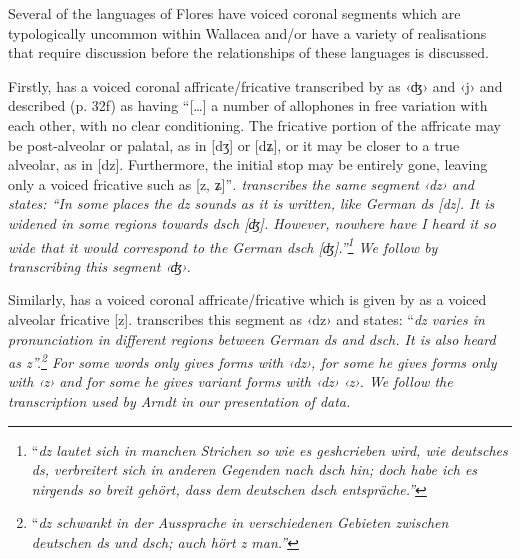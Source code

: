Several of the languages of Flores have voiced coronal segments
which are typologically uncommon within Wallacea and/or have
a variety of realisations that require discussion before the
relationships of these languages is discussed.

Firstly,  has a voiced coronal affricate/fricative transcribed
by \citet{Elias2018} as ‹ʤ›
and ‹j› and described (p.
32f) as having “[{\ldots}] a number of allophones in free variation
with each other, with no clear conditioning.
The fricative portion of the affricate may be post-alveolar or
palatal, as in [dʒ] or [dʑ],
or it may be closer to a true alveolar, as in [dz].
Furthermore, the initial stop may be entirely gone,
leaving only a voiced fricative such as [z,
ʑ]”\it{.} \citet[6]{Arndt1933} transcribes the same segment ‹dz›
and states: “In some places the \it{dz} sounds as it is written,
like German \it{ds} [dz].
It is widened in some regions towards \it{dsch} [ʤ].
However, nowhere have I heard it so wide that it would correspond
to the German \it{dsch} [ʤ].”\footnote{
		“\it{dz} lautet sich in
		manchen Strichen so wie es geshcrieben wird,
		wie deutsches \it{ds}, verbreitert sich in anderen Gegenden nach
		\it{dsch} hin; doch habe ich es nirgends so breit gehört,
		dass dem deutschen \it{dsch} entspräche.”}
We follow \citet{Elias2018}
by transcribing this segment  ‹ʤ›.

Similarly,  has a voiced coronal affricate/fricative which
is given by \citet[114]{Djawanai1983} as a voiced alveolar fricative [z].
\citet[9]{Arndt1961} transcribes this segment as ‹dz›
and states: “\it{dz} varies in pronunciation in different regions
between German \it{ds} and \it{dsch}.
It is also heard as \it{z}”.\footnote{
		“\it{dz} schwankt in der
		Aussprache in verschiedenen Gebieten zwischen deutschen \it{ds}
		und \it{dsch}; auch hört \it{z} man.”}
For some words \citet{Arndt1961}
only gives forms with ‹dz›,
for some he gives forms only with ‹z›
and for some he gives variant forms with ‹dz› {\tl} ‹z›.
We follow the transcription used by Arndt in our presentation of  data.

